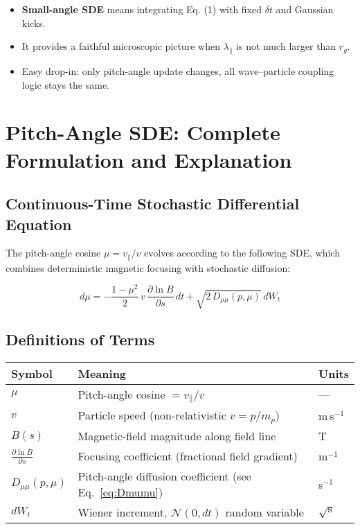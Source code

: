 {\begin{itemize}
  \item \textbf{Small-angle SDE} means integrating Eq. (1) with fixed $\delta t$ and Gaussian kicks.
  \item It provides a faithful microscopic picture when $\lambda_\parallel$ is not much larger than $r_g$.
  \item Easy drop-in: only pitch-angle update changes, all wave–particle coupling logic stays the same.
\end{itemize}

\section*{Pitch-Angle SDE: Complete Formulation and Explanation}

\subsection*{Continuous-Time Stochastic Differential Equation}

The pitch-angle cosine $\mu = v_\parallel / v$ evolves according to the following SDE, which combines deterministic magnetic focusing with stochastic diffusion:

\begin{tcolorbox}
\[
\boxed{
d\mu
= -\frac{1 - \mu^2}{2} \, v \, \frac{\partial \ln B}{\partial s} \, dt
+ \sqrt{2 \, D_{\mu\mu}(p,\mu)} \, dW_t
}
\tag{1}
\]
\end{tcolorbox}

\subsection*{Definitions of Terms}

\begin{center}
\begin{tabular}{@{}lll@{}}
\toprule
\textbf{Symbol} & \textbf{Meaning} & \textbf{Units} \\
\midrule
$\mu$ & Pitch-angle cosine $= v_\parallel / v$ & — \\
$v$ & Particle speed (non-relativistic $v = p / m_p$) & m\,s$^{-1}$ \\
$B(s)$ & Magnetic-field magnitude along field line & T \\
$\displaystyle \frac{\partial \ln B}{\partial s}$ & Focusing coefficient (fractional field gradient) & m$^{-1}$ \\
$D_{\mu\mu}(p,\mu)$ & Pitch-angle diffusion coefficient (see Eq.~\ref{eq:Dmumu}) & s$^{-1}$ \\
$dW_t$ & Wiener increment, $\mathcal{N}(0,dt)$ random variable & $\sqrt{\text{s}}$ \\
\bottomrule
\end{tabular}
\end{center}

}
